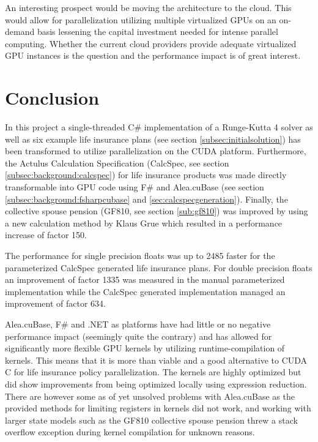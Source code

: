 An interesting prospect would be moving the architecture to the cloud.
This would allow for parallelization utilizing multiple virtualized GPUs on an on-demand basis lessening the capital investment needed for intense parallel computing.
Whether the current cloud providers provide adequate virtualized GPU instances is the question and the performance impact is of great interest.

\section{Conclusion}
In this project a single-threaded C\# implementation of a Runge-Kutta 4 solver as well as six example life insurance plans (see section \ref{subsec:initialsolution}) has been transformed to utilize parallelization on the CUDA platform.
Furthermore, the Actulus Calculation Specification (CalcSpec, see section \ref{subsec:background:calcspec}) for life insurance products was made directly transformable into GPU code using F\# and Alea.cuBase (see section \ref{subsec:background:fsharpcubase} and \ref{sec:calcspecgeneration}).
Finally, the collective spouse pension (GF810, see section \ref{sub:gf810}) was improved by using a new calculation method by Klaus Grue which resulted in a performance increase of factor 150.

The performance for single precision floats was up to 2485 faster for the parameterized CalcSpec generated life insurance plans.
For double precision floats an improvement of factor 1335 was measured in the manual parameterized implementation while the CalcSpec generated implementation managed an improvement of factor 634.

Alea.cuBase, F\# and .NET as platforms have had little or no negative performance impact (seemingly quite the contrary) and has allowed for significantly more flexible GPU kernels by utilizing runtime-compilation of kernels.
This means that it is more than viable and a good alternative to CUDA C for life insurance policy parallelization.
The kernels are highly optimized but did show improvements from being optimized locally using expression reduction.
There are however some as of yet unsolved problems with Alea.cuBase as the provided methods for limiting registers in kernels did not work, and working with larger state models such as the GF810 collective spouse pension threw a stack overflow exception during kernel compilation for unknown reasons.

\clearpage